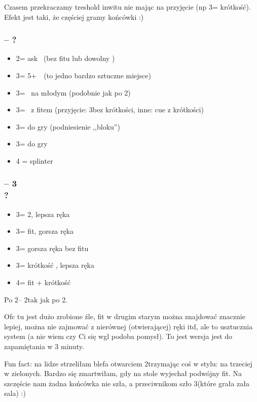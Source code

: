 \documentclass[12pt, a4paper]{report}
\begin{document}
Czasem przekraczamy treshold inwitu nie mając na przyjęcie (np 3\spades = krótkość).
Efekt jest taki, że częściej gramy końcówki :)

\subsubsection*{\alrts{2\spades} -- ?}
\begin{itemize}
    \item 2\nt = ask \invp\ (bez fitu lub dowolny \gf)
    \item 3\clubs = 5+\hearts\ \fonce\ (to jedno bardzo sztuczne miejsce) \imp
    \item 3\diams = \gf\ na młodym (podobnie jak po 2\hearts)
    \item 3\hearts = \invp\ z fitem (przyjęcie: 3\nt bez krótkości, inne: cue z krótkości)
    \item 3\spades = do gry (podniesienie ,,bloku'')
    \item 3\nt = do gry
    \item 4 = splinter
\end{itemize}

\subsubsection*{\alrts{2\spades} -- 3\clubs \\ ?}
\begin{itemize}
    \item 3\diams = 2\hearts, lepsza ręka
    \item 3\hearts = fit, gorsza ręka
    \item 3\spades = gorsza ręka bez fitu
    \item 3\nt = krótkość \hearts, lepsza ręka
    \item 4\minor = fit + krótkość
\end{itemize}

Po 2\spades -- 2\nt tak jak po 2\hearts.

Ofc tu jest dużo zrobione źle, fit w drugim starym można znajdować znacznie lepiej,
\nt można nie zajmować z nierównej (otwierającej) ręki itd, ale
to usztucznia system (a nie wiem czy Ci się wgl podoba pomysł).
To jest wersja jest do zapamiętania w 3 minuty.

Fun fact: na lidze strzeliłam blefa otwarciem 2\spades trzymając coś w stylu:
na trzeciej w zielonych. Bardzo się zmartwiłam, gdy na stole wyjechał podwójny fit.
Na szczęście nam żadna końcówka nie szła, a przeciwnikom szło 3\nt (które grała zała sala) :)
\end{document}
